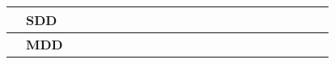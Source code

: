 \begin{table}[ht!]
\begin{tabular}{lp{2.5in}|llllllllllllllllllll|}
    \multicolumn{1}{|l|}{\cellcolor[HTML]{00E2FF}\textbf{}}                & \cellcolor[HTML]{00E2FF}\textbf{SDD}                                       & \multicolumn{1}{l|}{}                                   & \multicolumn{1}{l|}{}                                   & \multicolumn{1}{l|}{}                                   & \multicolumn{1}{l|}{\cellcolor[HTML]{F8A102}}           & \multicolumn{1}{l|}{\cellcolor[HTML]{F8A102}}           & \multicolumn{1}{l|}{\cellcolor[HTML]{F8A102}}           & \multicolumn{1}{l|}{}                                   & \multicolumn{1}{l|}{}                                   & \multicolumn{1}{l|}{}                                   & \multicolumn{1}{l|}{}                                    & \multicolumn{1}{l|}{}                                    & \multicolumn{1}{l|}{}                                    & \multicolumn{1}{l|}{}                                    & \multicolumn{1}{l|}{}                                    & \multicolumn{1}{l|}{}                                    & \multicolumn{1}{l|}{}                                    & \multicolumn{1}{l|}{}                                    & \multicolumn{1}{l|}{}                                    & \multicolumn{1}{l|}{}                                    &             \\ \hline
    \multicolumn{1}{|l|}{\cellcolor[HTML]{00E2FF}\textbf{}}                & \cellcolor[HTML]{00E2FF}\textbf{MDD}                                       & \multicolumn{1}{l|}{}                                   & \multicolumn{1}{l|}{}                                   & \multicolumn{1}{l|}{}                                   & \multicolumn{1}{l|}{}                                   & \multicolumn{1}{l|}{}                                   & \multicolumn{1}{l|}{}                                   & \multicolumn{1}{l|}{\cellcolor[HTML]{F8A102}}           & \multicolumn{1}{l|}{\cellcolor[HTML]{F8A102}}           & \multicolumn{1}{l|}{\cellcolor[HTML]{F8A102}}           & \multicolumn{1}{l|}{\cellcolor[HTML]{F8A102}}            & \multicolumn{1}{l|}{\cellcolor[HTML]{F8A102}}            & \multicolumn{1}{l|}{\cellcolor[HTML]{F8A102}}            & \multicolumn{1}{l|}{\cellcolor[HTML]{F8A102}}            & \multicolumn{1}{l|}{\cellcolor[HTML]{F8A102}}            & \multicolumn{1}{l|}{\cellcolor[HTML]{F8A102}}            & \multicolumn{1}{l|}{\cellcolor[HTML]{F8A102}}            & \multicolumn{1}{l|}{\cellcolor[HTML]{F8A102}}            & \multicolumn{1}{l|}{\cellcolor[HTML]{F8A102}}            & \multicolumn{1}{l|}{}                                    &             \\ \hline

\end{tabular}
\end{table}
